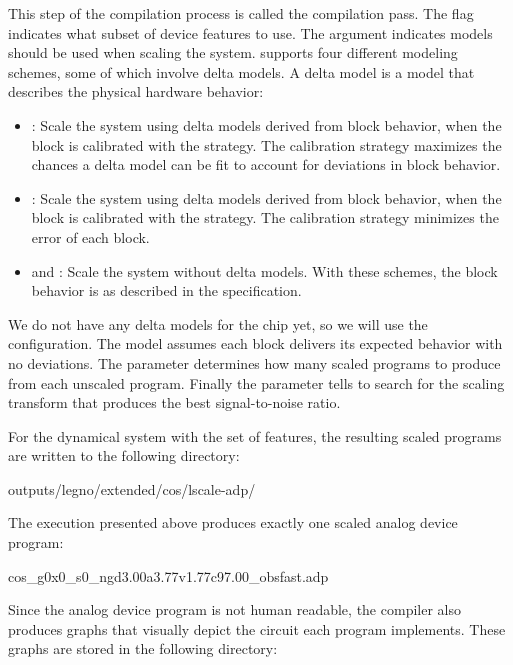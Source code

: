 This step of the compilation process is called the \lscale compilation pass. The
 flag indicates what subset of device features to use. The
 argument indicates models should be used when scaling the system.
\legno supports four different modeling schemes, some of which involve delta
models. A delta model is a model that describes the physical hardware behavior:

\begin{itemize}
\item{}: Scale the system using delta models derived from block
  behavior, when the block is calibrated with the  strategy. The
   calibration strategy maximizes the chances a delta model can be fit to
  account for deviations in block behavior.
\item{}: Scale the system using delta models derived from
  block behavior, when the block is calibrated with the  strategy.
  The  calibration strategy minimizes the error of each block.
\item{} and : Scale the system without delta
  models. With these schemes, the block behavior is as described in the
  specification.
\end{itemize}

We do not have any delta models for the chip yet, so we will use the 
configuration. The  model assumes each block delivers its
expected behavior with no deviations. The  parameter
determines how many scaled programs to produce from each unscaled program.
Finally the  parameter tells \legno to search for the scaling
transform that produces the best signal-to-noise ratio.

For the  dynamical system with the  set of features, the
resulting scaled programs are written to the following directory:

\begin{snippet}
  outputs/legno/extended/cos/lscale-adp/
\end{snippet}

The \lscale execution presented above produces exactly one scaled analog device program: 

\begin{snippet}
  cos_g0x0_s0_ngd3.00a3.77v1.77c97.00_obsfast.adp
\end{snippet}

Since the analog device program is not human readable, the compiler
also produces graphs that visually depict the circuit each program implements.
These graphs are stored in the following directory:

